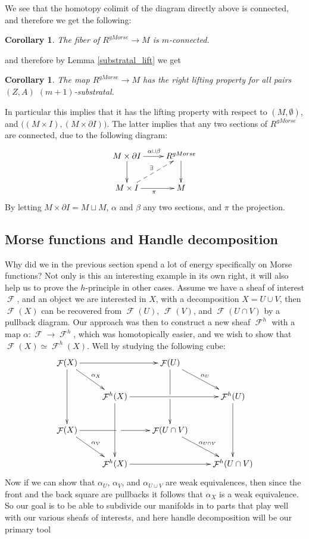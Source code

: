 \documentclass{article}
\newtheorem{corollary}[theorem]{Corollary}
\newtheorem{proposed work}[theorem]{Proposed Work}
\DeclareMathOperator{\CF}{\mathcal F}
\newcommand{\xymat}[1]{\begin{align*}\xymatrix{ #1}\end{align*}}
\begin{document}
We see that the homotopy colimit of the diagram directly above is connected, and therefore we get the following:
\begin{corollary}
The fiber of $R^{gMorse}\to M$ is $m$-connected.
\end{corollary}
and therefore by Lemma \ref{substratal_lift} we get
\begin{corollary}
The map $R^{gMorse}\to M$ has the right lifting property for all pairs $(Z,A)$ $(m+1)$-substratal.
\end{corollary}
In particular this implies that it has the lifting property with respect to $(M,\emptyset)$, and $\big((M\times I),(M\times \partial I) \big)$. The latter implies that any two sections of $R^{gMorse}$ are connected, due to the following diagram:
\xymat{M\times \partial I \ar[r]^{\alpha \sqcup \beta} \ar[d] & R^{gMorse}  \ar[d] \\
M\times I \ar[r]_\pi \ar@{-->}[ur]^{\exists}& M}
By letting $M\times \partial I=M\sqcup M$, $\alpha$ and $\beta$ any two sections, and $\pi$ the projection.

\subsection{Morse functions and Handle decomposition}
Why did we in the previous section spend a lot of energy specifically on Morse functions? Not only is this an interesting example in its own right, it will also help us to prove the $h$-principle in other cases. Assume we have a sheaf of interest $\CF$, and an object we are interested in $X$, with a decomposition $X=U\cup V$, then $\CF (X)$ can be recovered from $\CF (U)$, $\CF (V)$, and $\CF (U\cap V)$ by a pullback diagram. Our approach was then to construct a new sheaf $\CF^h$ with a map $\alpha: \CF\to \CF^h$, which was homotopically easier, and we wish to show that $\CF(X)\simeq \CF^h(X)$. Well by studying the following cube:
\xymat{\CF(X) \ar[rr] \ar[dd] \ar[dr]^{\alpha_X} && \CF(U) \ar[dd]|\hole \ar[dr]^{\alpha_U} & \\
&\CF^h(X) \ar[rr] \ar[dd] && \CF^h(U) \ar[dd] \\
\CF(X) \ar[rr]|\hole \ar[dr]^{\alpha_V} && \CF(U\cap V)  \ar[dr]^{\alpha_{U\cap V}} & \\
&\CF^h(X) \ar[rr] && \CF^h(U\cap V)   }
Now if we can show that $\alpha_U$, $\alpha_{V}$, and $\alpha_{U\cup V}$ are weak equivalences, then since the front and the back square are pullbacks it follows that $\alpha_X$ is a weak equivalence. So our goal is to be able to subdivide our manifolds in to parts that play well with our various sheafs of interests, and here handle decomposition will be our primary tool
\end{document}
